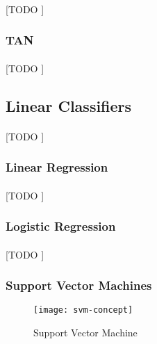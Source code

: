 \documentclass{article}
\begin{document}
				\paragraph{}
				[TODO ]

			\subsubsection{TAN}
			\label{sec:tan-bayes}

				\paragraph{}
				[TODO ]

		\subsection{Linear Classifiers}
		\label{sec:decision-trees}

			\paragraph{}
			[TODO ]

			\subsubsection{Linear Regression}
			\label{sec:linear-regression}

				\paragraph{}
				[TODO ]

			\subsubsection{Logistic Regression}
			\label{sec:logistic-regression}

				\paragraph{}
				[TODO ]

			\subsubsection{Support Vector Machines}
			\label{sec:svm}
			
				\begin{figure}
					\centering
					\texttt{[image: svm-concept]}
					\caption{Support Vector Machine}
					\label{fig:svm-concept}
				\end{figure}
\end{document}

